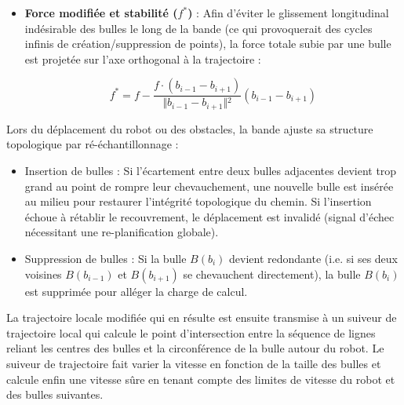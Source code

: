 \begin{itemize}
    \item \textbf{Force modifiée et stabilité ($f^*$)} : Afin d'éviter le glissement longitudinal indésirable des bulles le long de la bande (ce qui provoquerait des cycles infinis de création/suppression de points), la force totale subie par une bulle est projetée sur l'axe orthogonal à la trajectoire :
    
    \begin{equation}
        f^* = f - \frac{f \cdot (b_{i-1} - b_{i+1})}{\Vert{}b_{i-1} - b_{i+1}\Vert{}^2} (b_{i-1} - b_{i+1})
        \label{eq14}
    \end{equation}

\end{itemize}

Lors du déplacement du robot ou des obstacles, la bande ajuste sa structure topologique par ré-échantillonnage :  \\
\begin{itemize}
\renewcommand{\labelitemi}{$\rightarrow$}
    \item Insertion de bulles : Si l'écartement entre deux bulles adjacentes devient trop grand au point de rompre leur chevauchement, une nouvelle bulle est insérée au milieu pour restaurer l'intégrité topologique du chemin. Si l'insertion échoue à rétablir le recouvrement, le déplacement est invalidé (signal d'échec nécessitant une re-planification globale).  
    \item Suppression de bulles : Si la bulle $B(b_i)$ devient redondante (i.e. si ses deux voisines $B(b_{i-1})$ et $B(b_{i+1})$ se chevauchent directement), la bulle $B(b_i)$ est supprimée pour alléger la charge de calcul.\\
\end{itemize}

 

La trajectoire locale modifiée qui en résulte est ensuite transmise à un suiveur de trajectoire local qui calcule le point d'intersection entre la séquence de lignes reliant les centres des bulles et la circonférence de la bulle autour du robot. Le suiveur de trajectoire fait varier la vitesse en fonction de la taille des bulles et calcule enfin une vitesse sûre en tenant compte des limites de vitesse du robot et des bulles suivantes.


